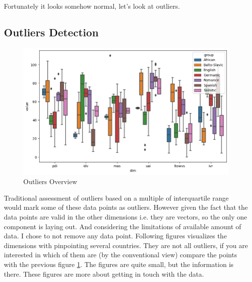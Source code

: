 \documentclass[a4paper,10pt]{article}
\begin{document}
Fortunately it looks somehow normal, let's look at outliers.

\subsection{Outliers Detection}

\begin{figure}[H]
       \begin{center}
              \includegraphics[width=12cm]{../figures/dim_overview.png}
       \end{center}
       \caption{Outliers Overview}
       \label{overview}
\end{figure}

Traditional assessment of outliers based on a multiple of interquartile range would mark some of these data points as outliers.
However given the fact that the data points are valid in the other dimensions i.e. they are vectors, so the only one component is laying out.
And considering the limitations of available amount of data.
I chose to not remove any data point.
Following figures visualizes the dimensions with pinpointing several countries.
They are not all outliers, if you are interested in which of them are (by the conventional view) compare the points with the previous figure \ref{overview}.
The figures are quite small, but the information is there.
These figures are more about getting in touch with the data.
\end{document}
